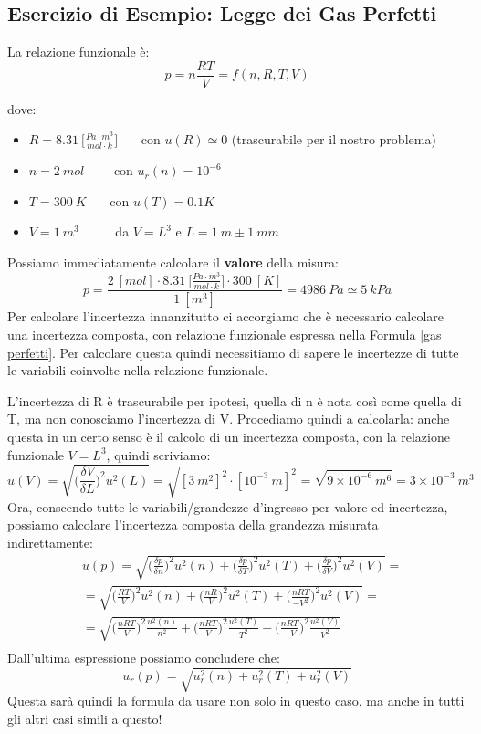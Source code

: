\documentclass[a4paper,11pt]{report}
\begin{document}
\subsection{Esercizio di Esempio: Legge dei Gas Perfetti}
La relazione funzionale è:
\begin{equation}
  \label{gas perfetti}
  p = n \frac{RT}{V} = f (n,R,T,V)
\end{equation}

dove:
\begin{itemize}
  \item $R = 8.31~\Bigg[\frac{Pa\cdot m^3}{mol\cdot k}\Bigg]$~~~ con $u(R) \simeq 0$ (trascurabile per il nostro problema)
  \item $n = 2~mol$~~~~ con $u_r(n) = 10^{-6}$
  \item $T = 300~K$~~~ con $u(T) = 0.1 K$
  \item $V = 1~m^3$~~~~~ da $V = L^3$ e $L = 1~m\pm 1~mm$
\end{itemize}
Possiamo immediatamente calcolare il \textbf{valore} della misura:
$$
  p = \frac{2~[mol]\cdot 8.31~\Bigg[\frac{Pa\cdot m^3}{mol\cdot k}\Bigg]\cdot 300~[K]}{1~[m^3]} = 4986~Pa \simeq 5~kPa
$$
Per calcolare l'incertezza innanzitutto ci accorgiamo che è necessario calcolare una incertezza composta, con relazione funzionale espressa nella Formula \ref{gas perfetti}. Per calcolare questa quindi necessitiamo di sapere le incertezze di tutte le variabili coinvolte nella relazione funzionale.

L'incertezza di R è trascurabile per ipotesi, quella di n è nota così come quella di T, ma non conosciamo l'incertezza di V. Procediamo quindi a calcolarla: anche questa in un certo senso è il calcolo di un incertezza composta, con la relazione funzionale $ V = L^3 $, quindi scriviamo:
$$
  u(V) = \sqrt{\Bigg(\frac{\delta V}{\delta L}\Bigg)^2 u^2(L)} = \sqrt{[3~m^2]^2\cdot[10^{-3}~m]^2} = \sqrt{9\times 10^{-6}~m^6} = 3\times 10^{-3}~ m^3
$$
Ora, conscendo tutte le variabili/grandezze d'ingresso per valore ed incertezza, possiamo calcolare l'incertezza composta della grandezza misurata indirettamente:
\begin{align*}
&u(p) = \sqrt{\Bigg(\frac{\delta p}{\delta n}\Bigg)^2 u^2(n)+\Bigg(\frac{\delta p}{\delta T}\Bigg)^2 u^2(T)+\Bigg(\frac{\delta p}{\delta V}\Bigg)^2 u^2(V)} =\\
&= \sqrt{\Bigg(\frac{RT}{V}\Bigg)^2 u^2(n)+\Bigg(\frac{nR}{V}\Bigg)^2 u^2(T)+\Bigg(\frac{nRT}{-V^2}\Bigg)^2 u^2(V)} =\\
&= \sqrt{\Bigg(\frac{nRT}{V}\Bigg)^2 \frac{u^2(n)}{n^2}+\Bigg(\frac{nRT}{V}\Bigg)^2 \frac{u^2(T)}{T^2}+\Bigg(\frac{nRT}{-V}\Bigg)^2 \frac{u^2(V)}{V^2}}\\
\end{align*}
Dall'ultima espressione possiamo concludere che:
\begin{equation}
\label{formula incertezza composta}
  u_r(p) = \sqrt{u_r^2(n)+u_r^2(T)+u_r^2(V)}
\end{equation}
Questa sarà quindi la formula da usare non solo in questo caso, ma anche in tutti gli altri casi simili a questo!
\end{document}
